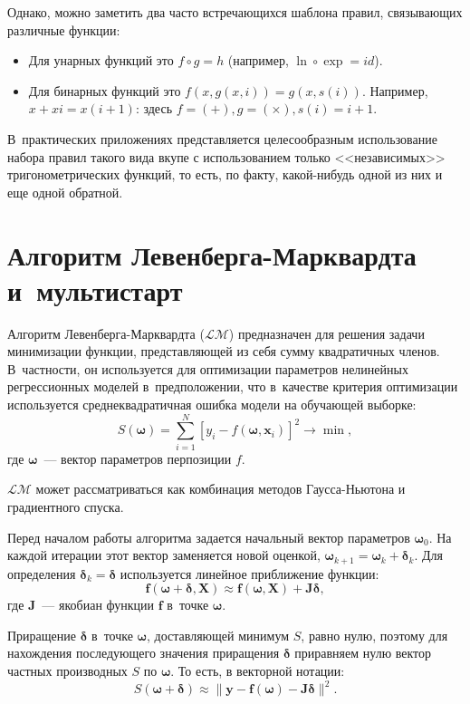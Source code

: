 \documentclass[12pt,a4paper]{amsart}
\begin{document}
Однако, можно заметить два часто встречающихся шаблона правил, связывающих
различные функции:
\begin{itemize}
  \item Для унарных функций это $f \circ g = h$ (например,
	$\ln \circ \exp = id$).
  \item Для бинарных функций это $ f (x, g (x, i)) = g (x, s (i)) $.
	Например, $x + xi = x(i+1)$: здесь $f = (+), g = (\times), s(i) = i + 1$.
\end{itemize}

В~практических приложениях представляется целесообразным использование
набора правил такого вида вкупе с использованием только <<независимых>>
тригонометрических функций, то есть, по факту, какой-нибудь одной из них
и еще одной обратной.

\section{Алгоритм Левенберга-Марквардта и~мультистарт}

Алгоритм Левенберга-Марквардта ($\mathcal{LM}$) \cite{Marquardt1963Algorithm, more:78}
предназначен для решения задачи минимизации функции, представляющей из себя
сумму квадратичных членов. В~частности, он используется для оптимизации
параметров нелинейных регрессионных моделей в~предположении, что в~качестве
критерия оптимизации используется среднеквадратичная ошибка модели на
обучающей выборке:
\[
S(\boldsymbol{\omega}) = \sum_{i=1}^{N} [y_i - f(\boldsymbol{\omega}, \mathbf{x}_i)]^2 \to \min,
\]
где $\boldsymbol{\omega}$~--- вектор параметров перпозиции $f$.

$\mathcal{LM}$ может рассматриваться как комбинация методов Гаусса-Ньютона и
градиентного спуска.

Перед началом работы алгоритма задается начальный вектор параметров $\boldsymbol{\omega}_0$.
На каждой итерации этот вектор заменяется новой оценкой,
$\boldsymbol{\omega}_{k+1} = \boldsymbol{\omega}_k + \boldsymbol{\delta}_k$.
Для определения $\boldsymbol{\delta}_k = \boldsymbol{\delta}$ используется линейное приближение функции:
\[
\mathbf{f(\boldsymbol{\omega} + \boldsymbol{\delta}, X)} \approx
	\mathbf{f(\boldsymbol{\omega}, X)} + \mathbf{J} \boldsymbol{\delta},
\]
где $\mathbf{J}$~--- якобиан функции $\mathbf{f}$ в~точке $\boldsymbol{\omega}$.

Приращение $\boldsymbol{\delta}$ в~точке $\boldsymbol{\omega}$, доставляющей минимум $S$,
равно нулю, поэтому для нахождения последующего значения приращения $\boldsymbol{\delta}$
приравняем нулю вектор частных производных $S$ по $\boldsymbol{\omega}$. То есть,
в векторной нотации:
\[
S(\mathbf{\boldsymbol{\omega} + \boldsymbol{\delta}}) \approx \| \mathbf{y - f (\boldsymbol{\omega}) - J\boldsymbol{\delta}} \|^2.
\]
\end{document}
